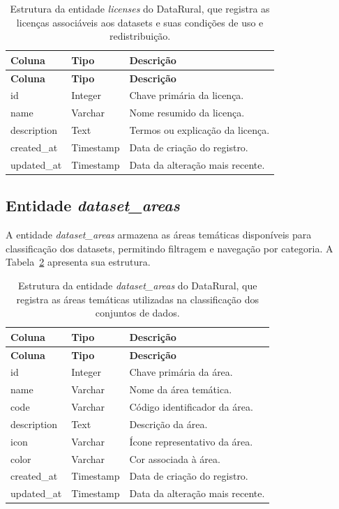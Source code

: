 \begin{longtable}{p{}p{}p{}}
\caption{Estrutura da entidade \textit{licenses} do DataRural, que registra as licenças associáveis aos datasets e suas condições de uso e redistribuição.}\label{tab:entity_licenses}\\
\toprule
\textbf{Coluna} & \textbf{Tipo} & \textbf{Descrição} \\
\midrule
\endfirsthead
\toprule
\textbf{Coluna} & \textbf{Tipo} & \textbf{Descrição} \\
\midrule
\endhead
id & Integer & Chave primária da licença. \\
name & Varchar & Nome resumido da licença. \\
description & Text & Termos ou explicação da licença. \\
created\_at & Timestamp & Data de criação do registro. \\
updated\_at & Timestamp & Data da alteração mais recente. \\
\bottomrule
\end{longtable}

\subsection{Entidade \textit{dataset\_areas}}

A entidade \textit{dataset\_areas} armazena as áreas temáticas disponíveis para classificação dos datasets, permitindo filtragem e navegação por categoria. A Tabela~\ref{tab:entity_dataset_areas} apresenta sua estrutura.

\begin{longtable}{p{}p{}p{}}
\caption{Estrutura da entidade \textit{dataset\_areas} do DataRural, que registra as áreas temáticas utilizadas na classificação dos conjuntos de dados.}\label{tab:entity_dataset_areas}\\
\toprule
\textbf{Coluna} & \textbf{Tipo} & \textbf{Descrição} \\
\midrule
\endfirsthead
\toprule
\textbf{Coluna} & \textbf{Tipo} & \textbf{Descrição} \\
\midrule
\endhead
id & Integer & Chave primária da área. \\
name & Varchar & Nome da área temática. \\
code & Varchar & Código identificador da área. \\
description & Text & Descrição da área. \\
icon & Varchar & Ícone representativo da área. \\
color & Varchar & Cor associada à área. \\
created\_at & Timestamp & Data de criação do registro. \\
updated\_at & Timestamp & Data da alteração mais recente. \\
\bottomrule
\end{longtable}

